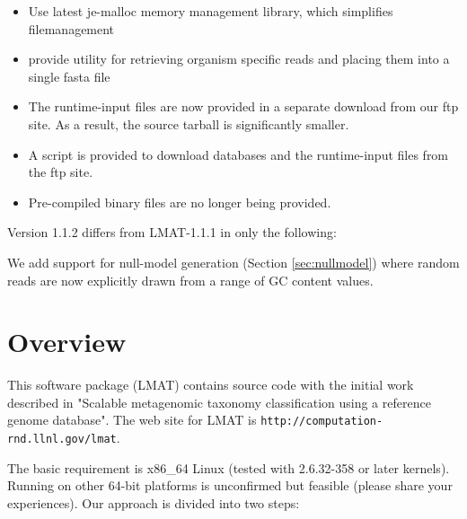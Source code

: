 \documentclass[11pt]{article}
\begin{document}
\begin{itemize}
\item Use latest je-malloc memory management library, which simplifies filemanagement
\item provide utility for retrieving organism specific reads and placing them into a single fasta file
\item The runtime-input files are now provided in a separate download from our ftp site.  As a result, the source tarball is significantly smaller.
\item A script is provided to download databases and the runtime-input files from the ftp site.
\item Pre-compiled binary files are no longer being provided.
\end{itemize}



Version 1.1.2 differs from LMAT-1.1.1 in only the following:

We add support for null-model generation (Section \ref{sec:nullmodel})
where random reads are now explicitly drawn from a range of GC content
values.


\section{Overview}

This software package (LMAT) contains source code with the initial work described in
"Scalable metagenomic taxonomy classification using a reference genome 
database".   
     The web site for LMAT is \texttt{http://computation-rnd.llnl.gov/lmat}.  
     
The basic requirement is x86\_64 Linux (tested with 2.6.32-358 or later kernels).  Running on other 64-bit platforms is unconfirmed but feasible (please share your experiences).
Our approach is divided into two steps:
\end{document}
